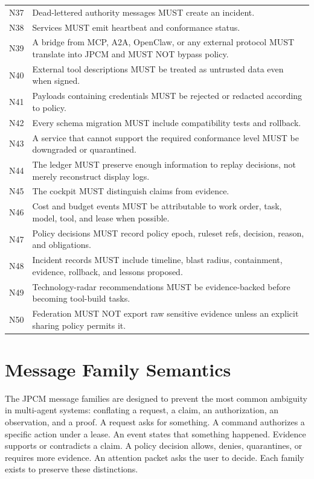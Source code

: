 \documentclass[journal,onecolumn]{IEEEtran}
\begin{document}
\begin{longtable}{p{}p{}}
N37 & Dead-lettered authority messages MUST create an incident.\\
N38 & Services MUST emit heartbeat and conformance status.\\
N39 & A bridge from MCP, A2A, OpenClaw, or any external protocol MUST translate into JPCM and MUST NOT bypass policy.\\
N40 & External tool descriptions MUST be treated as untrusted data even when signed.\\
N41 & Payloads containing credentials MUST be rejected or redacted according to policy.\\
N42 & Every schema migration MUST include compatibility tests and rollback.\\
N43 & A service that cannot support the required conformance level MUST be downgraded or quarantined.\\
N44 & The ledger MUST preserve enough information to replay decisions, not merely reconstruct display logs.\\
N45 & The cockpit MUST distinguish claims from evidence.\\
N46 & Cost and budget events MUST be attributable to work order, task, model, tool, and lease when possible.\\
N47 & Policy decisions MUST record policy epoch, ruleset refs, decision, reason, and obligations.\\
N48 & Incident records MUST include timeline, blast radius, containment, evidence, rollback, and lessons proposed.\\
N49 & Technology-radar recommendations MUST be evidence-backed before becoming tool-build tasks.\\
N50 & Federation MUST NOT export raw sensitive evidence unless an explicit sharing policy permits it.\\
\bottomrule
\end{longtable}

\section{Message Family Semantics}
The JPCM message families are designed to prevent the most common ambiguity in multi-agent systems: conflating a request, a claim, an authorization, an observation, and a proof. A request asks for something. A command authorizes a specific action under a lease. An event states that something happened. Evidence supports or contradicts a claim. A policy decision allows, denies, quarantines, or requires more evidence. An attention packet asks the user to decide. Each family exists to preserve these distinctions.
\end{document}
